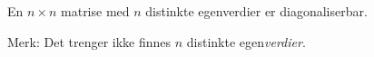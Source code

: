 En $n\times n$ matrise med $n$ distinkte egenverdier er diagonaliserbar.

Merk: Det trenger ikke finnes $n$ distinkte egen\emph{verdier}.
